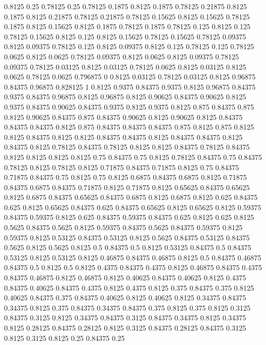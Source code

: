 0.8125 0.25
0.78125 0.25
0.78125 0.1875
0.8125 0.1875
0.78125 0.21875
0.8125 0.1875
0.8125 0.21875
0.78125 0.21875
0.78125 0.15625
0.8125 0.15625
0.78125 0.1875
0.8125 0.15625
0.8125 0.1875
0.78125 0.1875
0.78125 0.125
0.8125 0.125
0.78125 0.15625
0.8125 0.125
0.8125 0.15625
0.78125 0.15625
0.78125 0.09375
0.8125 0.09375
0.78125 0.125
0.8125 0.09375
0.8125 0.125
0.78125 0.125
0.78125 0.0625
0.8125 0.0625
0.78125 0.09375
0.8125 0.0625
0.8125 0.09375
0.78125 0.09375
0.78125 0.03125
0.8125 0.03125
0.78125 0.0625
0.8125 0.03125
0.8125 0.0625
0.78125 0.0625
0.796875 0
0.8125 0.03125
0.78125 0.03125
0.8125 0.96875
0.84375 0.96875
0.828125 1
0.8125 0.9375
0.84375 0.9375
0.8125 0.96875
0.84375 0.9375
0.84375 0.96875
0.8125 0.96875
0.8125 0.90625
0.84375 0.90625
0.8125 0.9375
0.84375 0.90625
0.84375 0.9375
0.8125 0.9375
0.8125 0.875
0.84375 0.875
0.8125 0.90625
0.84375 0.875
0.84375 0.90625
0.8125 0.90625
0.8125 0.84375
0.84375 0.84375
0.8125 0.875
0.84375 0.84375
0.84375 0.875
0.8125 0.875
0.8125 0.8125
0.84375 0.8125
0.8125 0.84375
0.84375 0.8125
0.84375 0.84375
0.8125 0.84375
0.8125 0.78125
0.84375 0.78125
0.8125 0.8125
0.84375 0.78125
0.84375 0.8125
0.8125 0.8125
0.8125 0.75
0.84375 0.75
0.8125 0.78125
0.84375 0.75
0.84375 0.78125
0.8125 0.78125
0.8125 0.71875
0.84375 0.71875
0.8125 0.75
0.84375 0.71875
0.84375 0.75
0.8125 0.75
0.8125 0.6875
0.84375 0.6875
0.8125 0.71875
0.84375 0.6875
0.84375 0.71875
0.8125 0.71875
0.8125 0.65625
0.84375 0.65625
0.8125 0.6875
0.84375 0.65625
0.84375 0.6875
0.8125 0.6875
0.8125 0.625
0.84375 0.625
0.8125 0.65625
0.84375 0.625
0.84375 0.65625
0.8125 0.65625
0.8125 0.59375
0.84375 0.59375
0.8125 0.625
0.84375 0.59375
0.84375 0.625
0.8125 0.625
0.8125 0.5625
0.84375 0.5625
0.8125 0.59375
0.84375 0.5625
0.84375 0.59375
0.8125 0.59375
0.8125 0.53125
0.84375 0.53125
0.8125 0.5625
0.84375 0.53125
0.84375 0.5625
0.8125 0.5625
0.8125 0.5
0.84375 0.5
0.8125 0.53125
0.84375 0.5
0.84375 0.53125
0.8125 0.53125
0.8125 0.46875
0.84375 0.46875
0.8125 0.5
0.84375 0.46875
0.84375 0.5
0.8125 0.5
0.8125 0.4375
0.84375 0.4375
0.8125 0.46875
0.84375 0.4375
0.84375 0.46875
0.8125 0.46875
0.8125 0.40625
0.84375 0.40625
0.8125 0.4375
0.84375 0.40625
0.84375 0.4375
0.8125 0.4375
0.8125 0.375
0.84375 0.375
0.8125 0.40625
0.84375 0.375
0.84375 0.40625
0.8125 0.40625
0.8125 0.34375
0.84375 0.34375
0.8125 0.375
0.84375 0.34375
0.84375 0.375
0.8125 0.375
0.8125 0.3125
0.84375 0.3125
0.8125 0.34375
0.84375 0.3125
0.84375 0.34375
0.8125 0.34375
0.8125 0.28125
0.84375 0.28125
0.8125 0.3125
0.84375 0.28125
0.84375 0.3125
0.8125 0.3125
0.8125 0.25
0.84375 0.25
